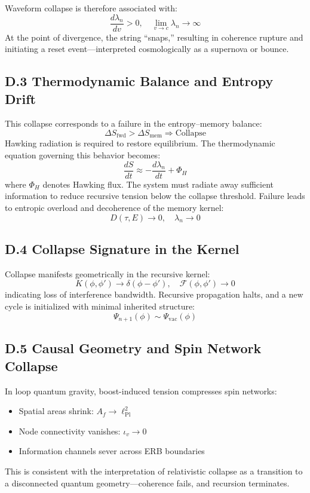Waveform collapse is therefore associated with:
\[
\frac{d\lambda_n}{dv} > 0, \quad \lim_{v \to c} \lambda_n \to \infty
\]
At the point of divergence, the string “snaps,” resulting in coherence rupture and initiating a reset event—interpreted cosmologically as a supernova or bounce.

\subsection*{D.3 Thermodynamic Balance and Entropy Drift}

This collapse corresponds to a failure in the entropy–memory balance:
\[
\Delta S_{\text{fwd}} > \Delta S_{\text{mem}} \Rightarrow \text{Collapse}
\]
Hawking radiation is required to restore equilibrium. The thermodynamic equation governing this behavior becomes:
\[
\frac{dS}{dt} \approx -\frac{d\lambda_n}{dt} + \Phi_H
\]
where \( \Phi_H \) denotes Hawking flux. The system must radiate away sufficient information to reduce recursive tension below the collapse threshold. Failure leads to entropic overload and decoherence of the memory kernel:
\[
D(\tau, E) \to 0, \quad \lambda_n \to 0
\]

\subsection*{D.4 Collapse Signature in the Kernel}

Collapse manifests geometrically in the recursive kernel:
\[
K(\phi, \phi') \to \delta(\phi - \phi'), \quad \mathcal{F}(\phi, \phi') \to 0
\]
indicating loss of interference bandwidth. Recursive propagation halts, and a new cycle is initialized with minimal inherited structure:
\[
\Psi_{n+1}(\phi) \sim \Psi_{\text{vac}}(\phi)
\]

\subsection*{D.5 Causal Geometry and Spin Network Collapse}

In loop quantum gravity, boost-induced tension compresses spin networks:
\begin{itemize}
  \item Spatial areas shrink: \( A_f \to \ell_{\text{Pl}}^2 \)
  \item Node connectivity vanishes: \( \iota_v \to 0 \)
  \item Information channels sever across ERB boundaries
\end{itemize}
This is consistent with the interpretation of relativistic collapse as a transition to a disconnected quantum geometry—coherence fails, and recursion terminates.

